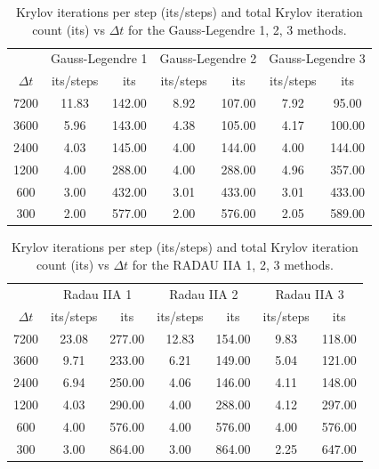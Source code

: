 \documentclass[a4paper, 12pt]{article}
\newcommand{\revisedus}[1]{#1}
\begin{document}
\cleardoublepage



\begin{table}
  \revisedus{
  \centering
  \begin{tabular}{ccccccc}
    & \multicolumn{2}{c}{Gauss-Legendre 1} &
    \multicolumn{2}{c}{Gauss-Legendre 2} &
    \multicolumn{2}{c}{Gauss-Legendre 3} \\
   $\Delta t$  &  its/steps  &  its 
   &  its/steps  &  its
   &  its/steps  &  its 
    \\ \hline
7200 & 11.83 & 142.00 & 8.92 & 107.00 & 7.92 & 95.00 \\
3600 & 5.96 & 143.00 & 4.38 & 105.00 & 4.17 & 100.00 \\
2400 & 4.03 & 145.00 & 4.00 & 144.00 & 4.00 & 144.00 \\
1200 & 4.00 & 288.00 & 4.00 & 288.00 & 4.96 & 357.00 \\
600 & 3.00 & 432.00 & 3.01 & 433.00 & 3.01 & 433.00 \\
300 & 2.00 & 577.00 & 2.00 & 576.00 & 2.05 & 589.00 \\
\end{tabular}
\caption{Krylov iterations per step (its/steps) and total Krylov iteration count (its) vs $\Delta t$ for the Gauss-Legendre  1, 2, 3 methods.}
\label{tab_niter_vs_dt G}}
\end{table}


\begin{table}[h]
  \revisedus{\centering
    \begin{tabular}{ccccccc}
        & \multicolumn{2}{c}{Radau IIA 1} &
    \multicolumn{2}{c}{Radau IIA 2} &
    \multicolumn{2}{c}{Radau IIA 3} \\
   $\Delta t$  &  its/steps  &  its 
   &  its/steps  &  its
   &  its/steps  &  its 
    \\ \hline
7200 & 23.08 & 277.00 & 12.83 & 154.00 & 9.83 & 118.00 \\
3600 & 9.71 & 233.00 & 6.21 & 149.00 & 5.04 & 121.00 \\
2400 & 6.94 & 250.00 & 4.06 & 146.00 & 4.11 & 148.00 \\
1200 & 4.03 & 290.00 & 4.00 & 288.00 & 4.12 & 297.00 \\
600 & 4.00 & 576.00 & 4.00 & 576.00 & 4.00 & 576.00 \\
300 & 3.00 & 864.00 & 3.00 & 864.00 & 2.25 & 647.00 \\
\end{tabular}
\caption{Krylov iterations per step (its/steps) and total Krylov iteration count (its) vs $\Delta t$ for the RADAU IIA 1, 2, 3 methods.}
\label{tab1_niter_vs_dt R}}
\end{table}
\end{document}
